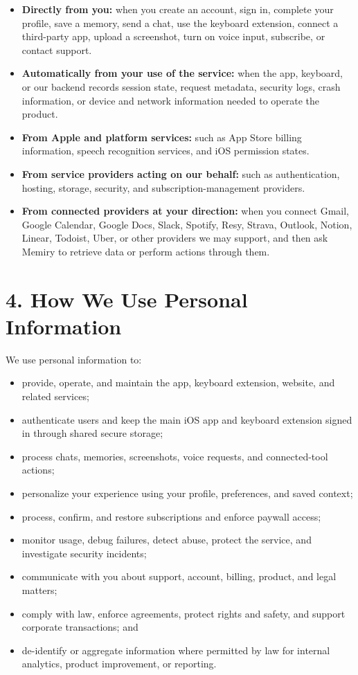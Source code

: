 \documentclass[11pt]{article}
\begin{document}
\begin{itemize}
  \item \textbf{Directly from you:} when you create an account, sign in, complete your profile, save a memory, send a chat, use the keyboard extension, connect a third-party app, upload a screenshot, turn on voice input, subscribe, or contact support.
  \item \textbf{Automatically from your use of the service:} when the app, keyboard, or our backend records session state, request metadata, security logs, crash information, or device and network information needed to operate the product.
  \item \textbf{From Apple and platform services:} such as App Store billing information, speech recognition services, and iOS permission states.
  \item \textbf{From service providers acting on our behalf:} such as authentication, hosting, storage, security, and subscription-management providers.
  \item \textbf{From connected providers at your direction:} when you connect Gmail, Google Calendar, Google Docs, Slack, Spotify, Resy, Strava, Outlook, Notion, Linear, Todoist, Uber, or other providers we may support, and then ask Memiry to retrieve data or perform actions through them.
\end{itemize}

\section*{4. How We Use Personal Information}

We use personal information to:

\begin{itemize}
  \item provide, operate, and maintain the app, keyboard extension, website, and related services;
  \item authenticate users and keep the main iOS app and keyboard extension signed in through shared secure storage;
  \item process chats, memories, screenshots, voice requests, and connected-tool actions;
  \item personalize your experience using your profile, preferences, and saved context;
  \item process, confirm, and restore subscriptions and enforce paywall access;
  \item monitor usage, debug failures, detect abuse, protect the service, and investigate security incidents;
  \item communicate with you about support, account, billing, product, and legal matters;
  \item comply with law, enforce agreements, protect rights and safety, and support corporate transactions; and
  \item de-identify or aggregate information where permitted by law for internal analytics, product improvement, or reporting.
\end{itemize}
\end{document}
